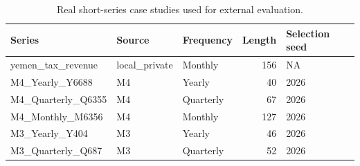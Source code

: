 ﻿\begin{table}[!t]
\centering
\small
\caption{Real short-series case studies used for external evaluation.}
\label{tab:real_short_series_metadata}
\begin{tabular}{lllrl}
\hline
Series & Source & Frequency & Length & Selection seed \\
\hline
yemen\_tax\_revenue & local\_private & Monthly & 156 & NA \\
M4\_Yearly\_Y6688 & M4 & Yearly & 40 & 2026 \\
M4\_Quarterly\_Q6355 & M4 & Quarterly & 67 & 2026 \\
M4\_Monthly\_M6356 & M4 & Monthly & 127 & 2026 \\
M3\_Yearly\_Y404 & M3 & Yearly & 46 & 2026 \\
M3\_Quarterly\_Q687 & M3 & Quarterly & 52 & 2026 \\
\hline
\end{tabular}
\end{table}
